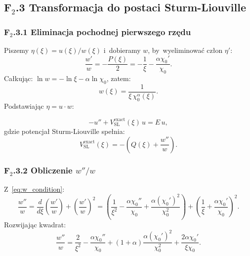 \subsection*{F$_2$.3 Transformacja do postaci Sturm-Liouville}

\subsubsection*{F$_2$.3.1 Eliminacja pochodnej pierwszego rzędu}

Piszemy $\eta(\xi) = u(\xi)/w(\xi)$ i~dobieramy $w$, by~wyeliminować
człon $\eta'$:
\begin{equation}
  \frac{w'}{w} = -\frac{P(\xi)}{2}
  = -\frac{1}{\xi} - \frac{\alpha\chi_0'}{\chi_0}.
  \label{eq:w_condition}
\end{equation}
Całkując: $\ln w = -\ln\xi - \alpha\ln\chi_0$, zatem:
\begin{equation}
  \boxed{w(\xi) = \frac{1}{\xi\,\chi_0^\alpha(\xi)}}.
  \label{eq:weight_function}
\end{equation}
Podstawiając $\eta = u \cdot w$:

\begin{equation}
  -u'' + V_\mathrm{SL}^\mathrm{exact}(\xi)\,u = E\,u,
  \label{eq:schrodinger_form}
\end{equation}
gdzie potencjał Sturm-Liouville spełnia:
\begin{equation}
  V_\mathrm{SL}^\mathrm{exact}(\xi)
  = -\left(Q(\xi) + \frac{w''}{w}\right).
  \label{eq:V_SL_def}
\end{equation}

\subsubsection*{F$_2$.3.2 Obliczenie $w''/w$}

Z~\eqref{eq:w_condition}:
\begin{equation}
  \frac{w''}{w}
  = \frac{d}{d\xi}\!\left(\frac{w'}{w}\right)
  + \left(\frac{w'}{w}\right)^2
  = \left(\frac{1}{\xi^2} - \frac{\alpha\chi_0''}{\chi_0}
    + \frac{\alpha(\chi_0')^2}{\chi_0^2}\right)
  + \left(\frac{1}{\xi} + \frac{\alpha\chi_0'}{\chi_0}\right)^2.
\end{equation}
Rozwijając kwadrat:
\begin{equation}
  \frac{w''}{w}
  = \frac{2}{\xi^2} - \frac{\alpha\chi_0''}{\chi_0}
  + (1+\alpha)\frac{\alpha(\chi_0')^2}{\chi_0^2}
  + \frac{2\alpha\chi_0'}{\xi\chi_0}.
  \label{eq:w2_over_w}
\end{equation}

